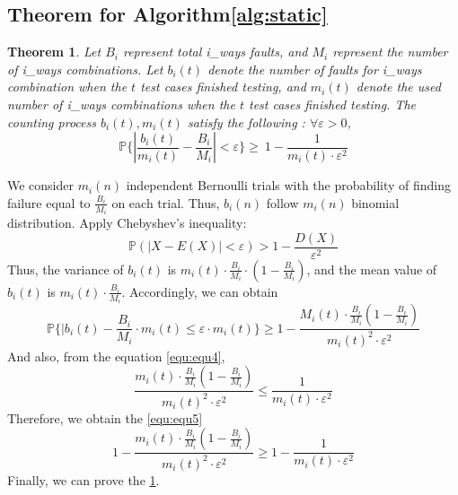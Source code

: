 \documentclass[10pt,conference, compsocconf]{IEEEtran}
\newtheorem{thm}{Theorem}[section]
\def\P{{\mathbb P}}
\begin{document}
\begin{CJK}{UTF8}{gkai}
\subsection{Theorem for Algorithm\ref{alg:static}}
 
\begin{thm}
\label{thm:thm2}
Let $B_i$ represent total i\_ways faults, and $M_i$ represent the number of i\_ways combinations.
Let $b_i(t)$ denote the number of faults for i\_ways combination when the $t$ test cases finished testing, 
and  $m_i(t)$ denote the used number of i\_ways combinations when the $t$ test cases finished testing.
The counting process $b_i(t),m_i(t)$ satisfy the following :
$\forall\varepsilon>0$,  
\begin{equation}
\label{equ:equ1}
\P\{|\frac{b_i(t)}{m_i(t)} - \frac{B_i}{M_i}| < \varepsilon \}\geq\ {1-\frac{1}{m_i(t)\cdot\varepsilon^2} }
\end{equation}
\end{thm}

We consider $m_i(n)$ independent Bernoulli trials with the 
probability of finding failure equal to $\frac{B_i}{M_i}$ on each trial.
Thus, $b_i(n)$ follow $m_i(n)$ binomial distribution.  
Apply Chebyshev's inequality:
\begin{equation}
\label{equ:equ2}
\P(|X-E(X)| < \varepsilon) > 1 - \frac{D(X)}{\varepsilon ^ 2}
\end{equation}
Thus, the variance of $b_i(t)$ is $m_i(t) \cdot \frac{B_i}{M_i} \cdot (1-\frac{B_i}{M_i})$,
and the mean value of $b_i(t)$ is $m_i(t) \cdot \frac{B_i}{M_i}$. 
Accordingly, we can obtain
\begin{equation}
\label{equ:equ3}
\P\{|b_i(t)-\frac{B_i}{M_i} \cdot m_i(t) \le \varepsilon \cdot m_i(t)\} \geq 1- \frac{M_i(t) \cdot \frac{B_i}{M_i}(1-\frac{B_i}{M_i})}{m_i(t)^2 \cdot \varepsilon^2}
\end{equation}
And also, from the equation \ref{equ:equ4},
\begin{equation}
\label{equ:equ4}
\frac{m_i(t) \cdot \frac{B_i}{M_i}(1-\frac{B_i}{M_i})}{m_i(t)^2 \cdot \varepsilon^2} \leq \frac{1}{m_i(t) \cdot \varepsilon^2}
\end{equation}
Therefore, we obtain the \ref{equ:equ5}
\begin{equation}
\label{equ:equ5}
1 - \frac{m_i(t) \cdot \frac{B_i}{M_i}(1-\frac{B_i}{M_i})}{m_i(t)^2 \cdot \varepsilon^2} \geq 1 - \frac{1}{m_i(t) \cdot \varepsilon^2}
\end{equation}
 Finally, we can prove the \ref{thm:thm2}.


\end{CJK}
\end{document}
